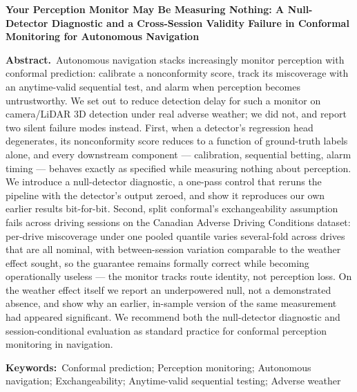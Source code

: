 \documentclass[12pt]{article}
\begin{document}
\pagestyle{empty}

\begin{center}
{\Large \bfseries Your Perception Monitor May Be Measuring Nothing: A Null-Detector Diagnostic and a Cross-Session Validity Failure in Conformal Monitoring for Autonomous Navigation}
\end{center}

\vspace{1.5em}

\noindent\textbf{Abstract.}\ Autonomous navigation stacks increasingly monitor perception with conformal prediction: calibrate a nonconformity score, track its miscoverage with an anytime-valid sequential test, and alarm when perception becomes untrustworthy. We set out to reduce detection delay for such a monitor on camera/LiDAR 3D detection under real adverse weather; we did not, and report two silent failure modes instead. First, when a detector's regression head degenerates, its nonconformity score reduces to a function of ground-truth labels alone, and every downstream component --- calibration, sequential betting, alarm timing --- behaves exactly as specified while measuring nothing about perception. We introduce a null-detector diagnostic, a one-pass control that reruns the pipeline with the detector's output zeroed, and show it reproduces our own earlier results bit-for-bit. Second, split conformal's exchangeability assumption fails across driving sessions on the Canadian Adverse Driving Conditions dataset: per-drive miscoverage under one pooled quantile varies several-fold across drives that are all nominal, with between-session variation comparable to the weather effect sought, so the guarantee remains formally correct while becoming operationally useless --- the monitor tracks route identity, not perception loss. On the weather effect itself we report an underpowered null, not a demonstrated absence, and show why an earlier, in-sample version of the same measurement had appeared significant. We recommend both the null-detector diagnostic and session-conditional evaluation as standard practice for conformal perception monitoring in navigation.

\vspace{1.5em}

\noindent\textbf{Keywords:}\ Conformal prediction; Perception monitoring; Autonomous navigation; Exchangeability; Anytime-valid sequential testing; Adverse weather
\end{document}

